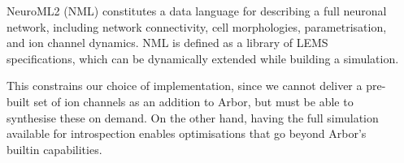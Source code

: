 \documentclass{beamer}
\begin{document}
\begin{frame}[t, fragile]
\begin{columns}
\begin{column}{0.49\textwidth}
      NeuroML2 (NML) constitutes a data language for describing a full neuronal
      network, including network connectivity, cell morphologies,
      parametrisation, and ion channel dynamics. NML is defined as a library of
      LEMS specifications, which can be dynamically extended while building a
      simulation.

      This constrains our choice of implementation, since we cannot deliver a
      pre-built set of ion channels as an addition to Arbor, but must be able to
      synthesise these on demand. On the other hand, having the full simulation
      available for introspection enables optimisations that go beyond Arbor's
      builtin capabilities.
    \end{column}
    \begin{column}{0.49\textwidth}


\end{column}
\end{columns}
\end{frame}
\end{document}
